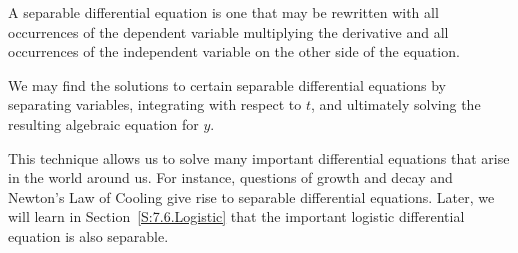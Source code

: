 






\begin{summary}
\item A separable differential equation is one that may be rewritten
  with all occurrences of the dependent variable multiplying the
  derivative and all occurrences of the independent variable on the
  other side of the equation.
\item We may find the solutions to certain separable differential equations
  by separating variables, integrating with respect to $t$, and ultimately solving the resulting algebraic equation for $y$.
 
\item This technique allows us to solve many important differential
  equations that arise in the world around us.  For instance, questions of
  growth and decay and Newton's Law of Cooling give rise to separable
  differential equations.  Later, we will learn in Section~\ref{S:7.6.Logistic} that the important logistic differential equation is also separable.
\end{summary}

\nin \hrulefill

\newpage

 



\clearpage
